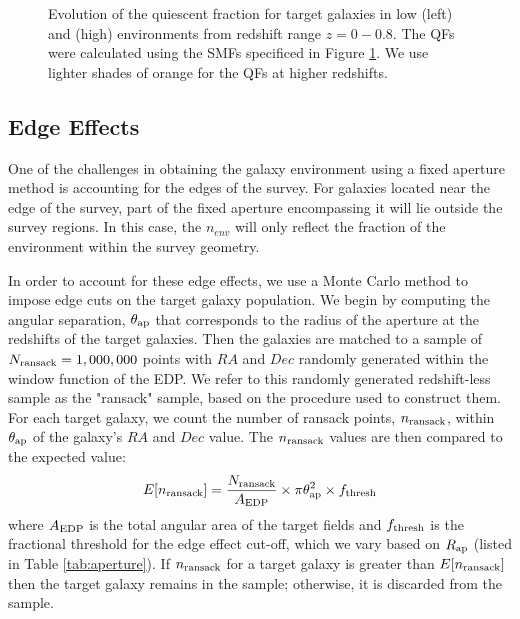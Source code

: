 \documentclass{emulateapj}
\begin{document}
\begin{figure*}
    \begin{center}
        \leavevmode
        \label{fig:smf}
        \caption{Evolution of the quiescent fraction for target galaxies in low (left) and (high) environments
from redshift range $z=0-0.8$. The QFs were calculated using the SMFs specificed in Figure \ref{fig:smf}. We use
lighter shades of orange for the QFs at higher redshifts.}
    \end{center}
\end{figure*}

\subsection{Edge Effects} \label{sec:edgeeffect}
One of the challenges in obtaining the galaxy environment using a fixed aperture method is accounting for the edges of the survey.
For galaxies located near the edge of the survey, part of the fixed aperture encompassing it will lie outside the survey regions. 
In this case, the $n_{env}$ will only reflect the fraction of the environment within the survey geometry.

In order to account for these edge effects, we use a Monte Carlo method to impose edge cuts on the target 
galaxy population. 
We begin by computing the angular separation, $\theta_{\rm{ap}}$ that corresponds to the radius of the 
aperture at the redshifts of the target galaxies.
Then the galaxies are matched to a sample of $N_{\rm{ransack}}=1,000,000$ points with $RA$ and $Dec$
 randomly generated within the window function of the EDP.  
We refer to this randomly generated redshift-less sample as the "ransack" sample, based on the procedure 
used to construct them. 
For each target galaxy, we count the number of ransack points, $n_{\rm{ransack}}$, within $\theta_{\rm{ap}}$
of the galaxy's $RA$ and $Dec$ value.
The $n_{\rm{ransack}}$ values are then compared to the expected value:
\begin{equation} \label{eq:ransack}
E[n_{\rm{ransack}}] = \frac{N_{\rm{ransack}}}{A_{\rm{EDP}}}\times {\pi \theta_{\rm{ap}}^2} \times f_{\rm{thresh}} 
\end{equation} 
where $A_{\rm{EDP}}$ is the total angular area of the target fields and $f_{\rm{thresh}}$ is the fractional 
threshold for the edge effect cut-off, which we vary based on $R_{\rm{ap}}$ (listed in Table \ref{tab:aperture}).
If $n_{\rm{ransack}}$ for a target galaxy is greater than $E[n_{\rm{ransack}}]$ then the target galaxy remains
in the sample; otherwise, it is discarded from the sample. 
\end{document}
